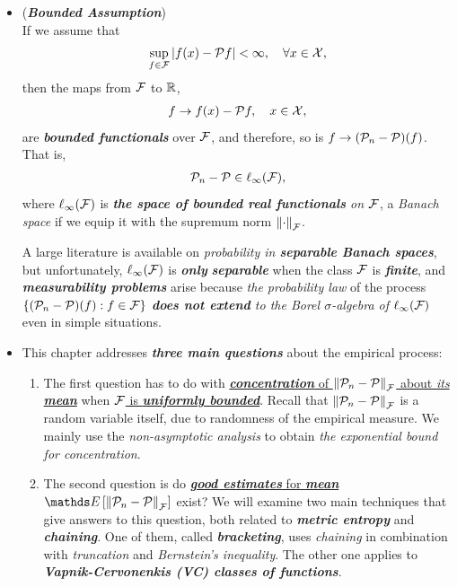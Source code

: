 \documentclass[11pt]{article}
\begin{document}
\begin{itemize}
\item \begin{remark} (\textbf{\emph{Bounded Assumption}})\\
If we assume that
\begin{align}
\sup_{f \in {\mathcal F}}\left\lvert f(x) - {\mathcal P} f \right\rvert < \infty, \quad \forall x \in {\mathcal X}, \label{def: empirical_process_bounded}
\end{align}
then the maps from ${\mathcal F}$ to ${\mathbb R}$,
\begin{align*}
f \rightarrow f(x) - {\mathcal P} f, \quad x\in {\mathcal X},
\end{align*} are \emph{\textbf{bounded functionals}} over ${\mathcal F}$, and therefore, so is $f \to  ({\mathcal P}_n - {\mathcal P})(f)$. That is,
\begin{align*}
{\mathcal P}_n - {\mathcal P} \in \ell_{\infty}({\mathcal F}),
\end{align*}
where  $\ell_{\infty}({\mathcal F})$ is \emph{\textbf{the space of bounded real functionals} on ${\mathcal F}$}, a \emph{Banach space} if we equip it with the supremum norm $\left\|\cdot\right\|_{{\mathcal F}}$. 

A large literature is available on \emph{probability in \textbf{separable Banach spaces}}, but unfortunately, $\ell_{\infty}({\mathcal F})$ is \emph{\textbf{only}} \emph{\textbf{separable}} when the class ${\mathcal F}$ is \emph{\textbf{finite}}, and \emph{\textbf{measurability problems}} arise because \emph{the probability law} of the process $\left\{ ({\mathcal P}_n - {\mathcal P})(f) : f \in {\mathcal F}\right\}$ \emph{\textbf{does not extend} to the Borel $\sigma$-algebra of $\ell_{\infty}({\mathcal F})$} even in simple situations.
\end{remark}

\item \begin{remark}
This chapter addresses \emph{\textbf{three main questions}} about the empirical process:
\begin{enumerate}
\item The first question has to do with \underline{\emph{\textbf{concentration}} of $\left\|{\mathcal P}_n  - {\mathcal P}\right\|_{{\mathcal F}}$ about \emph{its \textbf{mean}}} when \underline{${\mathcal F}$ is \emph{\textbf{uniformly bounded}}}. Recall that $\left\|{\mathcal P}_n  - {\mathcal P}\right\|_{{\mathcal F}}$ is a random variable itself, due to randomness of the empirical measure. We mainly use the \emph{non-asymptotic analysis} to obtain \emph{the exponential bound for concentration}.

\item The second question is do \underline{\emph{\textbf{good estimates}} for \emph{\textbf{mean}} $\E{}{\norm{\cP_n  - \cP}{\cF}}$} exist? We will examine two main techniques that give answers to this question, both related to \emph{\textbf{metric entropy}} and \emph{\textbf{chaining}}. One of them, called \emph{\textbf{bracketing}}, uses \emph{chaining} in combination with \emph{truncation} and \emph{Bernstein's inequality}. The other one applies to \emph{\textbf{Vapnik-Cervonenkis (VC) classes of functions}}.


\end{enumerate}
\end{remark}
\end{itemize}
\end{document}
